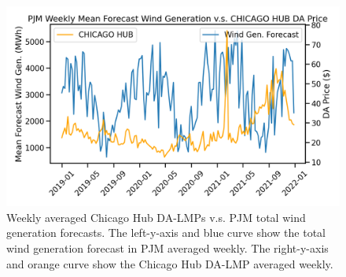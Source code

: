 \begin{figure}[htbp]
    \caption[Total aggregate wind generation v.s. day-ahead prices]{
        Weekly averaged Chicago Hub DA-LMPs v.s. PJM total wind generation forecasts.
        The left-y-axis and blue curve show the total wind generation forecast in PJM averaged weekly.
        The right-y-axis and orange curve show the Chicago Hub DA-LMP averaged weekly.
    }
    \begin{center}
        \setlength{\fboxsep}{0pt}%
        \setlength{\fboxrule}{1pt}%
        \includegraphics[width=120mm]{figs/windgen_vs_price}
    \end{center}
    \label{fig:weekly_windgen}
\end{figure}

